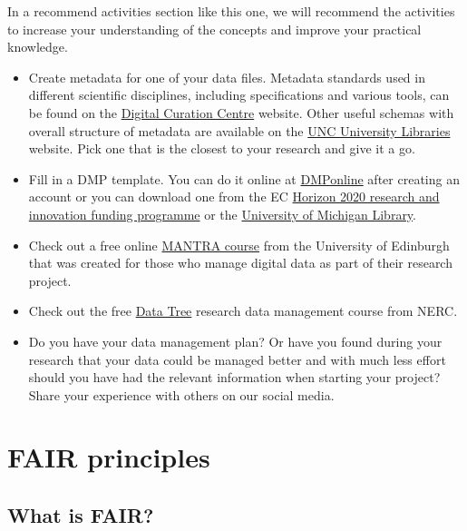 \documentclass[
]{book}
\begin{document}
In a recommend activities section like this one, we will recommend the activities to increase your understanding of the concepts and improve your practical knowledge.

\begin{itemize}
\item
  Create metadata for one of your data files. Metadata standards used in different scientific disciplines, including specifications and various tools, can be found on the \href{https://www.dcc.ac.uk/guidance/standards/metadata}{Digital Curation Centre} website. Other useful schemas with overall structure of metadata are available on the \href{https://guides.lib.unc.edu/metadata/standards}{UNC University Libraries} website. Pick one that is the closest to your research and give it a go.
\item
  Fill in a DMP template. You can do it online at \href{https://dmponline.dcc.ac.uk/}{DMPonline} after creating an account or you can download one from the EC \href{https://ec.europa.eu/research/participants/data/ref/h2020/gm/reporting/h2020-tpl-oa-data-mgt-plan_en.docx}{Horizon 2020 research and innovation funding programme} or the \href{https://guides.lib.umich.edu/c.php?g=283277\&p=2138498}{University of Michigan Library}.
\item
  Check out a free online \href{https://mantra.ed.ac.uk/}{MANTRA course} from the University of Edinburgh that was created for those who manage digital data as part of their research project.
\item
  Check out the free \href{https://datatree.org.uk/}{Data Tree} research data management course from NERC.
\item
  Do you have your data management plan? Or have you found during your research that your data could be managed better and with much less effort should you have had the relevant information when starting your project? Share your experience with others on our social media.
\end{itemize}

\hypertarget{fair-principles}{%
\chapter{FAIR principles}\label{fair-principles}}

\hypertarget{what-is-fair}{%
\section{What is FAIR?}\label{what-is-fair}}
\end{document}
